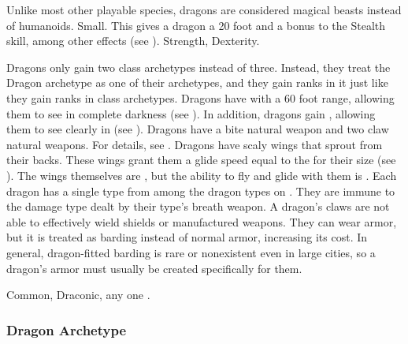          Unlike most other playable species, dragons are considered magical beasts instead of humanoids.
         Small. This gives a dragon a 20 foot  and a  bonus to the Stealth skill, among other effects (see ).
          Strength,  Dexterity.
        \begin{itemize}
             Dragons only gain two class archetypes instead of three.
                Instead, they treat the Dragon archetype as one of their archetypes, and they gain ranks in it just like they gain ranks in class archetypes.
             Dragons have  with a 60 foot range, allowing them to see in complete darkness (see ).
                In addition, dragons gain , allowing them to see clearly in  (see ).
             Dragons have a bite natural weapon and two claw natural weapons.
                For details, see .
             Dragons have scaly wings that sprout from their backs.
                These wings grant them a glide speed equal to the  for their size (see ).
                The wings themselves are , but the ability to fly and glide with them is \magical.
             Each dragon has a single type from among the dragon types on .
                They are immune to the damage type dealt by their type's breath weapon.
             A dragon's claws are not able to effectively wield shields or manufactured weapons.
                They can wear armor, but it is treated as barding instead of normal armor, increasing its cost.
                In general, dragon-fitted barding is rare or nonexistent even in large cities, so a dragon's armor must usually be created specifically for them.
        \end{itemize}
         Common, Draconic, any one .

        \subsubsection{Dragon Archetype}

